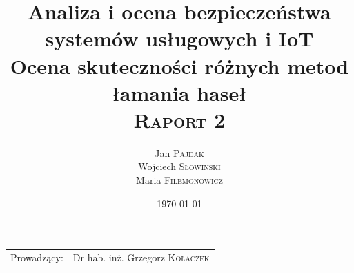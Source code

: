 \documentclass{article}
\title{Analiza i ocena bezpieczeństwa systemów usługowych i IoT \\ Ocena skuteczności różnych metod łamania haseł \\ \textsc{Raport 2}}
\author{Jan \textsc{Pajdak} \\ Wojciech \textsc{Słowiński} \\ Maria \textsc{Filemonowicz}}
\date{\today}
\begin{document}
	
	\maketitle
	\begin{center}
		\begin{tabular}{l r}
			Prowadzący: &  Dr hab. inż. Grzegorz \textsc{Kołaczek}
		\end{tabular}
	\end{center}
	
	\newpage
	\tableofcontents
	
	
	
	
	
	
	
	
	\newpage
\end{document}
